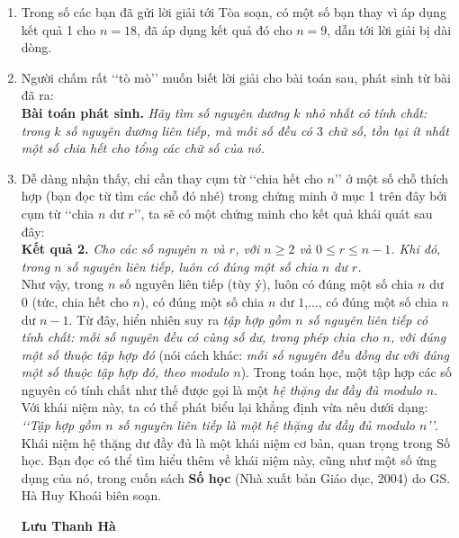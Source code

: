 \begin{bt}
{\begin{nx}
\begin{enumerate}[1.]
		Từ các kết quả đã chứng minh được ở trên, hiển nhiên suy ra điều phải chứng minh.
		 \textit{Lưu ý rằng, chứng minh nêu trên không phải là chứng minh duy nhất cho kết quả 1}.
		\item Trong số các bạn đã gửi lời giải tới Tòa soạn, có một số bạn thay vì áp dụng kết quả 1 cho $n=18$, đã áp dụng kết quả đó cho $n=9$, dẫn tới lời giải bị dài dòng.
		\item Người chấm rất {\lq\lq}tò mò{\rq\rq} muốn biết lời giải cho bài toán sau, phát sinh từ bài đã ra:\\
\textbf{Bài toán phát sinh.} \textit{Hãy tìm số nguyên dương $k$ nhỏ nhất có tính chất: trong $k$ số nguyên dương liên tiếp, mà mỗi số đều có $3$ chữ số, tồn tại ít nhất một số chia hết cho tổng các chữ số của nó.}
\item Dễ dàng nhận thấy, chỉ cần thay cụm từ {\lq\lq}chia hết cho $n${\rq\rq} ở một số chỗ thích hợp (bạn đọc từ tìm các chỗ đó nhé) trong chứng minh ở mục 1 trên đây bởi cụm từ {\lq\lq}chia $n$ dư $r${\rq\rq}, ta sẽ có một chứng minh cho kết quả khái quát sau đây:\\
\textbf{Kết quả 2.} \textit{Cho các số nguyên $n$ và $r$, với $n\geq 2$ và $0\leq r\leq n-1$. Khi đó, trong $n$ số nguyên liên tiếp, luôn có đúng một số chia $n$ dư $r$.}\\
Như vậy, trong $n$ số nguyên liên tiếp (tùy ý), luôn có đúng một số chia $n$ dư $0$ (tức, chia hết cho $n$), có đúng một số chia $n$ dư $1$,$\dots$, có đúng một số chia $n$ dư $n-1$. Từ đây, hiển nhiên suy ra \textit{tập hợp gồm $n$ số nguyên liên tiếp có tính chất: mỗi số nguyên đều có cùng số dư, trong phép chia cho $n$, với đúng một số thuộc tập hợp đó} (nói cách khác: \textit{mỗi số nguyên đều đồng dư với đúng một số thuộc tập hợp đó, theo modulo $n$}). Trong toán học, một tập hợp các số nguyên có tính chất như thế được gọi là một \textit{hệ thặng dư đầy đủ modulo $n$}. Với khái niệm này, ta có thể phát biểu lại khẳng định vừa nêu dưới dạng:\\
		\textit{{\lq\lq}Tập hợp gồm $n$ số nguyên liên tiếp là một hệ thặng dư đầy đủ modulo $n${\rq\rq}}.\\
		Khái niệm hệ thặng dư đầy đủ là một khái niệm cơ bản, quan trọng trong Số học. Bạn đọc có thể tìm hiểu thêm về khái niệm này, cũng như một số ứng dụng của nó, trong cuốn sách \textbf{Số học} (Nhà xuất bản Giáo dục, 2004) do GS. Hà Huy Khoái biên soạn.
		\begin{flushright}
			\textbf{Lưu Thanh Hà}
		\end{flushright}
	\end{enumerate}
\end{nx}
}
\end{bt}

